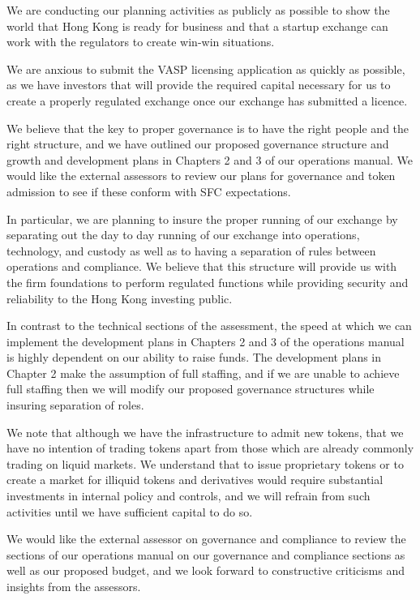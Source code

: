 \documentclass[]{report}
\begin{document}
We are conducting our planning activities as publicly as possible to
show the world that Hong Kong is ready for business and that a startup
exchange can work with the regulators to create win-win situations.

We are anxious to submit the VASP licensing application as quickly as
possible, as we have investors that will provide the required capital
necessary for us to create a properly regulated exchange once our
exchange has submitted a licence.

We believe that the key to proper governance is to have the right
people and the right structure, and we have outlined our proposed
governance structure and growth and development plans in Chapters 2
and 3 of our operations manual.  We would like the external assessors
to review our plans for governance and token admission to see if these
conform with SFC expectations.

In particular, we are planning to insure the proper running of our
exchange by separating out the day to day running of our exchange into
operations, technology, and custody as well as to having a separation
of rules between operations and compliance.  We believe that this
structure will provide us with the firm foundations to perform
regulated functions while providing security and reliability to the
Hong Kong investing public.

In contrast to the technical sections of the assessment, the speed at
which we can implement the development plans in Chapters 2 and 3 of
the operations manual is highly dependent on our ability to raise
funds.  The development plans in Chapter 2 make the assumption of full
staffing, and if we are unable to achieve full staffing
then we will modify our proposed governance structures while insuring
separation of roles.

We note that although we have the infrastructure to admit new tokens,
that we have no intention of trading tokens apart from those which are
already commonly trading on liquid markets.  We understand that to
issue proprietary tokens or to create a market for illiquid tokens and
derivatives would require substantial investments in internal policy
and controls, and we will refrain from such activities until we have
sufficient capital to do so.

We would like the external assessor on governance and compliance to
review the sections of our operations manual on our governance and
compliance sections as well as our proposed budget, and we look forward
to constructive criticisms and insights from the assessors.
\end{document}
